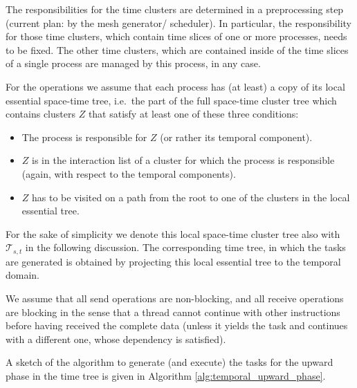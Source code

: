 \documentclass[a4paper,11pt]{article}
\theoremstyle{plain}
\theoremstyle{definition}
\theoremstyle{remark}
\begin{document}
The responsibilities for the time clusters are determined in a preprocessing step (current plan: by the mesh 
generator/ scheduler). In particular, the responsibility for those time clusters, which contain time slices of one 
or more processes, needs to be fixed. The other time clusters, which are contained inside of the time slices
of a single process are managed by this process, in any case. 

For the operations we assume that each process has (at least) a copy of its local essential space-time tree, i.e.~the 
part of the full space-time cluster tree which contains clusters $Z$ that satisfy at least one of these three 
conditions:
\begin{itemize}
  \item The process is responsible for $Z$ (or rather its temporal component).
  \item $Z$ is in the interaction list of a cluster for which the process is responsible (again, with respect to the 
  temporal components).
  \item $Z$ has to be visited on a path from the root to one of the clusters in the local essential tree.
\end{itemize}
For the sake of simplicity we denote this local space-time cluster tree also with $\mathcal{T}_{s,t}$ in the following 
discussion. The corresponding time tree, in which the tasks are generated is obtained by projecting this local 
essential tree to the temporal domain.  

We assume that all send operations are non-blocking, and all receive operations are blocking in the sense that a thread
cannot continue with other instructions before having received the complete data (unless it yields the task and 
continues with a different one, whose dependency is satisfied).

A sketch of the algorithm to generate (and execute) the tasks for the upward phase in the time tree is given in
Algorithm \ref{alg:temporal_upward_phase}.
\end{document}
